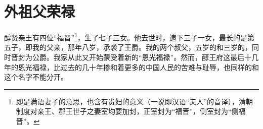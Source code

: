 \fancyhead[RO]{} %
\fancyhead[LE]{} %
\chapter*{外祖父荣禄}
\thispagestyle{empty}
醇贤亲王有四位“福晋”\footnote{即是满语妻子的意思，也含有贵妇的意义（一说即汉语“夫人”的音译），清朝制度对亲王、郡王世子之妻室均要加封，正室封为“福晋”，侧室封为“侧福晋”。}，生了七子三女。他去世时，遗下三子一女，最长的是第五子，即我的父亲，那年八岁，承袭了王爵。我的两个叔父，五岁的和三岁的，同时晋封为公爵。我家从此又开始蒙受着新的“恩光福禄”。然而，醇王府这最后十几年的恩光福禄，比过去的几十年掺和着更多的中国人民的苦难与耻辱，也同样的和这个名字不能分开。\\

